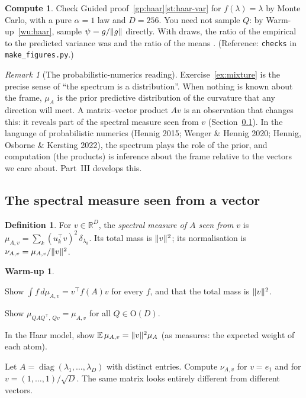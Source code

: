 \documentclass[11pt,a4paper]{article}
\newcommand{\R}{\mathbb{R}}
\newcommand{\E}{\mathbb{E}}
\newcommand{\Orth}{\mathrm{O}}
\DeclareMathOperator{\diag}{diag}
\DeclarePairedDelimiter{\norm}{\lVert}{\rVert}
\theoremstyle{plain}
\theoremstyle{definition}
\newtheorem{definition}[proposition]{Definition}
\newtheorem{warmup}[proposition]{Warm-up}
\newtheorem{compute}[proposition]{Compute}
\theoremstyle{remark}
\newtheorem{remark}[proposition]{Remark}
\begin{document}
\begin{compute}\label{cp:haar}
Check Guided proof~\ref{gp:haar}\ref{st:haar-var} for $f(\lambda)=\lambda$ by Monte Carlo, with a pure $\alpha=1$ law
and $D=256$. You need not sample $Q$: by Warm-up~\ref{wu:haar}, sample $\psi=g/\norm{g}$ directly. With
\NumHaarMCDraws{} draws, the ratio of the empirical to the predicted variance was \NumHaarMCVarRatio{} and the ratio
of the means \NumHaarMCMeanRatio. (Reference: \texttt{checks} in \texttt{make\_figures.py}.)
\end{compute}

\begin{remark}[The probabilistic-numerics reading]\label{rem:pn}
Exercise~\ref{ex:mixture} is the precise sense of ``the spectrum is a distribution''. When nothing is known about the
frame, $\mu_A$ is the prior predictive distribution of the curvature that any direction will meet. A matrix--vector
product $Av$ is an observation that changes this: it reveals part of the spectral measure seen from $v$
(Section~\ref{sec:seen}). In the language of probabilistic numerics (Hennig 2015; Wenger \& Hennig 2020; Hennig,
Osborne \& Kersting 2022), the spectrum plays the role of the prior, and computation (the products) is inference about
the frame relative to the vectors we care about. Part~III develops this.
\end{remark}

\subsection{The spectral measure seen from a vector}\label{sec:seen}

\begin{definition}\label{def:seen}
For $v\in\R^D$, the \emph{spectral measure of $A$ seen from $v$} is $\mu_{A,v}=\sum_k(u_k^\top v)^2\,\delta_{\lambda_k}$.
Its total mass is $\norm{v}^2$; its normalisation is $\nu_{A,v}=\mu_{A,v}/\norm{v}^2$.
\end{definition}

\begin{warmup}\label{wu:seen}
\begin{steps}
\item Show $\int f\,d\mu_{A,v}=v^\top f(A)v$ for every $f$, and that the total mass is $\norm{v}^2$.
\item Show $\mu_{QAQ^\top,\,Qv}=\mu_{A,v}$ for all $Q\in\Orth(D)$.
\item In the Haar model, show $\E\,\mu_{A,v}=\norm{v}^2\mu_A$ (as measures: the expected weight of each atom).
\item Let $A=\diag(\lambda_1,\dots,\lambda_D)$ with distinct entries. Compute $\nu_{A,v}$ for $v=e_1$ and for
  $v=(1,\dots,1)/\sqrt D$. The same matrix looks entirely different from different vectors.
\end{steps}
\end{warmup}
\end{document}
